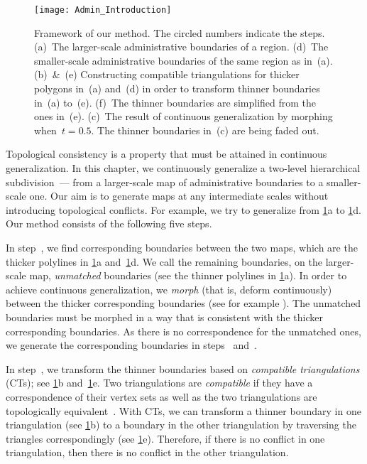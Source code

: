 \begin{figure}[tb]	
	\centering
	\texttt{[image: Admin\_Introduction]}
	\caption{Framework of our method.
		The circled numbers indicate the steps. 
		(a)~The larger-scale administrative boundaries of a 
		region. 
		(d)~The smaller-scale administrative boundaries of the 
		same region as in~(a). 
		(b)~\&~(e) Constructing compatible triangulations for
		thicker polygons in~(a) and~(d) in order to 
		transform thinner boundaries in~(a) to~(e).
		(f)~The thinner boundaries are simplified from the 
		ones in~(e). 
		(c)~The result of continuous generalization
		by morphing when~$t=0.5$.
		The thinner boundaries in~(c) are being faded out.
		}
	\label{fig:Admin_Introduction}
\end{figure}

Topological consistency is a property 
that must be attained in continuous generalization. 
In this chapter, we continuously generalize 
a two-level hierarchical subdivision~--- 
from a larger-scale map of administrative boundaries 
to a smaller-scale one.  
Our aim is to generate maps at any intermediate scales
without introducing topological conflicts.
For example, we try to generalize from
\fig\ref{fig:Admin_Introduction}a to
\fig\ref{fig:Admin_Introduction}d.
Our method consists of the following five steps.  

In step~, we find corresponding boundaries
between the two maps,
which are the thicker polylines in
\figs\ref{fig:Admin_Introduction}a 
and~\ref{fig:Admin_Introduction}d.  
We call the remaining boundaries, on the larger-scale map, 
\emph{unmatched} boundaries (see the
thinner polylines in \fig\ref{fig:Admin_Introduction}a). 
In order to achieve continuous generalization, 
we \emph{morph} (that is, deform continuously) 
between the thicker corresponding boundaries 
(see for example \textcite{Noellenburg2008}).
The unmatched boundaries must be morphed in a way 
that is consistent with the thicker corresponding boundaries.  
As there is no correspondence for the unmatched ones, 
we generate the corresponding boundaries 
in steps~ and~.

In step~, we transform the thinner boundaries 
based on \emph{compatible triangulations} (CTs); 
see \figs\ref{fig:Admin_Introduction}b 
and~\ref{fig:Admin_Introduction}e. 
Two triangulations are \emph{compatible} 
if they have a correspondence of their vertex sets as well as 
the two triangulations are topologically 
equivalent~\parencite{Surazhsky2001}. 
With CTs, 
we can transform a thinner boundary in one triangulation (see 
\fig\ref{fig:Admin_Introduction}b) 
to a boundary in the other triangulation 
by traversing the triangles correspondingly 
(see \fig\ref{fig:Admin_Introduction}e). 
Therefore, if there is no conflict in one triangulation, 
then there is no conflict in the other triangulation.
 


